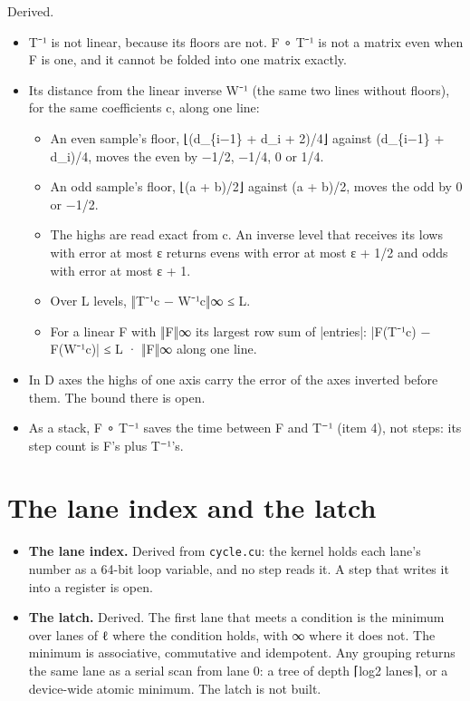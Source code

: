 Derived.

\begin{itemize}
\item T⁻¹ is not linear, because its floors are not. F ∘ T⁻¹ is not a matrix even when F is one, and it cannot be folded into one matrix exactly.
\item Its distance from the linear inverse W⁻¹ (the same two lines without floors), for the same coefficients c, along one line:

\begin{itemize}
\item An even sample's floor, ⌊(d\_\allowbreak{}\{i−1\} + d\_\allowbreak{}i + 2)/4⌋ against (d\_\allowbreak{}\{i−1\} + d\_\allowbreak{}i)/4, moves the even by −1/2, −1/4, 0 or 1/4.
\item An odd sample's floor, ⌊(a + b)/2⌋ against (a + b)/2, moves the odd by 0 or −1/2.
\item The highs are read exact from c. An inverse level that receives its lows with error at most ε returns evens with error at most ε + 1/2 and odds with error at most ε + 1.
\item Over L levels, ‖T⁻¹c − W⁻¹c‖∞ ≤ L.
\item For a linear F with ‖F‖∞ its largest row sum of |entries|: |F(T⁻¹c) − F(W⁻¹c)| ≤ L · ‖F‖∞ along one line.
\end{itemize}
\item In D axes the highs of one axis carry the error of the axes inverted before them. The bound there is open.
\item As a stack, F ∘ T⁻¹ saves the time between F and T⁻¹ (item 4), not steps: its step count is F's plus T⁻¹'s.
\end{itemize}

\section{\texorpdfstring{The lane index and the latch}{The lane index and the latch}}

\begin{itemize}
\item \textbf{The lane index.} Derived from \texttt{cycle.\allowbreak{}cu}: the kernel holds each lane's number as a 64-bit loop variable, and no step reads it. A step that writes it into a register is open.
\item \textbf{The latch.} Derived. The first lane that meets a condition is the minimum over lanes of ℓ where the condition holds, with ∞ where it does not. The minimum is associative, commutative and idempotent. Any grouping returns the same lane as a serial scan from lane 0: a tree of depth ⌈log2 lanes⌉, or a device-wide atomic minimum. The latch is not built.
\end{itemize}

